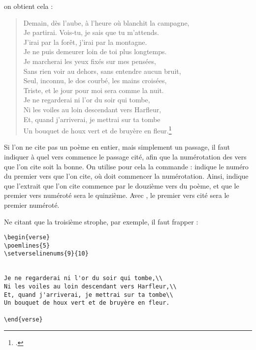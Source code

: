 on obtient cela :

\begin{verse}

Demain, dès l'aube, à l'heure où blanchit la campagne,\\
Je partirai. Vois-tu, je sais que tu m'attends.\\
J'irai par la forêt, j'irai par la montagne.\\
Je ne puis demeurer loin de toi plus longtemps.\\

Je marcherai les yeux fixés sur mes pensées,\\
Sans rien voir au dehors, sans entendre aucun bruit,\\
Seul, inconnu, le dos courbé, les mains croisées,\\
Triste, et le jour pour moi sera comme la nuit.\\

Je ne regarderai ni l'or du soir qui tombe,\\
Ni les voiles au loin descendant vers Harfleur,\\
Et, quand j'arriverai, je mettrai sur ta tombe\\
Un bouquet de houx vert et de bruyère en fleur.\footcite{demain}

\end{verse}



Si l'on ne cite pas un poème en entier, mais simplement un passage, il faut indiquer à quel vers commence le passage cité, afin que la numérotation des vers que l'on cite soit la bonne.
On utilise pour cela la commande  :  indique le numéro du premier vers que l'on cite,  où doit commencer la numérotation. Ainsi,  indique que l'extrait que l'on cite commence par le douzième vers du poème, et que le premier vers numéroté sera le quinzième. 
Avec , le premier vers cité sera le premier numéroté.

Ne citant que la troisième strophe, par exemple, il faut frapper :
\begin{verbatim}
\begin{verse}
\poemlines{5}
\setverselinenums{9}{10}


Je ne regarderai ni l'or du soir qui tombe,\\
Ni les voiles au loin descendant vers Harfleur,\\
Et, quand j'arriverai, je mettrai sur ta tombe\\
Un bouquet de houx vert et de bruyère en fleur.

\end{verse}
\end{verbatim}

